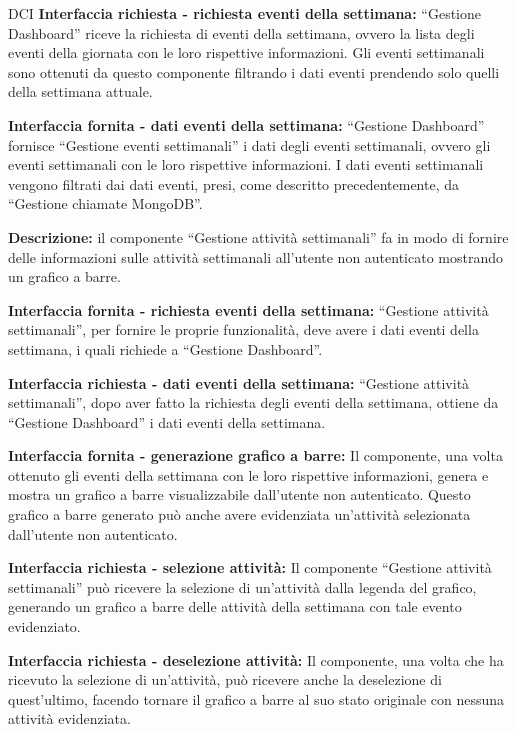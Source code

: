 \begin{listaPersonale}{DCI}
    \textbf{Interfaccia richiesta - richiesta eventi della settimana:} “Gestione Dashboard” riceve la richiesta di eventi della settimana, ovvero la lista degli eventi della giornata con le loro rispettive informazioni. Gli eventi settimanali sono ottenuti da questo componente filtrando i dati eventi prendendo solo quelli della settimana attuale.

    \textbf{Interfaccia fornita - dati eventi della settimana:} “Gestione Dashboard” fornisce  “Gestione eventi settimanali” i dati degli eventi settimanali, ovvero gli eventi settimanali con le loro rispettive informazioni. I dati eventi settimanali vengono filtrati dai dati eventi, presi, come descritto precedentemente, da “Gestione chiamate MongoDB”.



    \textbf{Descrizione:} il componente “Gestione attività settimanali” fa in modo di fornire delle informazioni sulle attività settimanali all'utente non autenticato mostrando un grafico a barre.

    \textbf{Interfaccia fornita - richiesta eventi della settimana:} “Gestione attività settimanali”, per fornire le proprie funzionalità, deve avere i dati eventi della settimana, i quali richiede a “Gestione Dashboard”.

    \textbf{Interfaccia richiesta - dati eventi della settimana:} “Gestione attività settimanali”, dopo aver fatto la richiesta degli eventi della settimana, ottiene da “Gestione Dashboard” i dati eventi della settimana.

    \textbf{Interfaccia fornita - generazione grafico a barre:} Il componente, una volta ottenuto gli eventi della settimana con le loro rispettive informazioni, genera e mostra un grafico a barre visualizzabile dall'utente non autenticato. Questo grafico a barre generato può anche avere evidenziata un'attività selezionata dall'utente non autenticato.

    \textbf{Interfaccia richiesta - selezione attività:} Il componente “Gestione attività settimanali” può ricevere la selezione di un'attività dalla legenda del grafico, generando un grafico a barre delle attività della settimana con tale evento evidenziato.

    \textbf{Interfaccia richiesta - deselezione attività:} Il componente, una volta che ha ricevuto la selezione di un'attività, può ricevere anche la deselezione di quest'ultimo, facendo tornare il grafico a barre al suo stato originale con nessuna attività evidenziata.



\end{listaPersonale}
